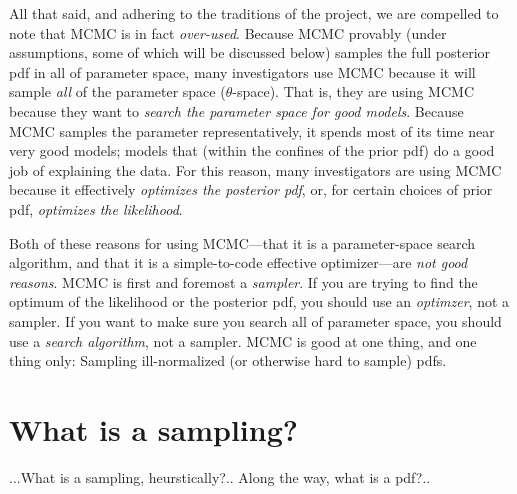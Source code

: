 \documentclass[12pt,twoside,pdftex]{article}
\newcommand{\pars}{\theta}
\begin{document}
All that said, and adhering to the traditions of the  project, we are
compelled to note that MCMC is in fact \emph{over-used}.
Because MCMC provably (under assumptions, some of which will be discussed below) samples the full
posterior pdf in all of parameter space, many investigators use MCMC
because it will sample \emph{all} of the parameter space
($\pars$-space).
That is, they are using MCMC because they want to
\emph{search the parameter space for good models}.
Because MCMC samples the parameter representatively, it spends most of
its time near very good models; models that (within the confines of
the prior pdf) do a good job of explaining the data.
For this reason, many investigators are using MCMC because it
effectively \emph{optimizes the posterior pdf}, or, for certain
choices of prior pdf, \emph{optimizes the likelihood}.

Both of these reasons for using MCMC---that it is a parameter-space
search algorithm, and that it is a simple-to-code effective
optimizer---are \emph{not good reasons}.  MCMC is first and foremost a
\emph{sampler}.  If you are trying to find the optimum of the
likelihood or the posterior pdf, you should use an \emph{optimzer},
not a sampler.  If you want to make sure you search all of parameter
space, you should use a \emph{search algorithm}, not a sampler.  MCMC
is good at one thing, and one thing only: Sampling ill-normalized (or
otherwise hard to sample) pdfs.

\section{What is a sampling?}

...What is a sampling, heurstically?.. Along the way, what is a pdf?..
\end{document}
